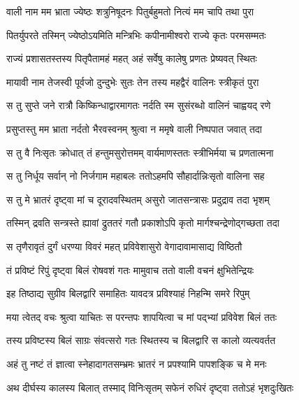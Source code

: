 
\twolineshloka
{वाली नाम मम भ्राता ज्येष्ठः शत्रुनिषूदनः}
{पितुर्बहुमतो नित्यं मम चापि तथा पुरा} %

\twolineshloka
{पितर्युपरते तस्मिन् ज्येष्ठोऽयमिति मन्त्रिभिः}
{कपीनामीश्वरो राज्ये कृतः परमसम्मतः} %

\twolineshloka
{राज्यं प्रशासतस्तस्य पितृपैतामहं महत्}
{अहं सर्वेषु कालेषु प्रणतः प्रेष्यवत् स्थितः} %

\twolineshloka
{मायावी नाम तेजस्वी पूर्वजो दुन्दुभेः सुतः}
{तेन तस्य महद्वैरं वालिनः स्त्रीकृतं पुरा} %

\twolineshloka
{स तु सुप्ते जने रात्रौ किष्किन्धाद्वारमागतः}
{नर्दति स्म सुसंरब्धो वालिनं चाह्वयद् रणे} %

\twolineshloka
{प्रसुप्तस्तु मम भ्राता नर्दतो भैरवस्वनम्}
{श्रुत्वा न ममृषे वाली निष्पपात जवात् तदा} %

\twolineshloka
{स तु वै निःसृतः क्रोधात् तं हन्तुमसुरोत्तमम्}
{वार्यमाणस्ततः स्त्रीभिर्मया च प्रणतात्मना} %

\twolineshloka
{स तु निर्धूय सर्वान् नो निर्जगाम महाबलः}
{ततोऽहमपि सौहार्दान्निःसृतो वालिना सह} %

\twolineshloka
{स तु मे भ्रातरं दृष्ट्वा मां च दूरादवस्थितम्}
{असुरो जातसन्त्रासः प्रदुद्राव तदा भृशम्} %

\twolineshloka
{तस्मिन् द्रवति सन्त्रस्ते ह्यावां द्रुततरं गतौ}
{प्रकाशोऽपि कृतो मार्गश्चन्द्रेणोद्गच्छता तदा} %

\twolineshloka
{स तृणैरावृतं दुर्गं धरण्या विवरं महत्}
{प्रविवेशासुरो वेगादावामासाद्य विष्ठितौ} %

\twolineshloka
{तं प्रविष्टं रिपुं दृष्ट्वा बिलं रोषवशं गतः}
{मामुवाच ततो वाली वचनं क्षुभितेन्द्रियः} %

\twolineshloka
{इह तिष्ठाद्य सुग्रीव बिलद्वारि समाहितः}
{यावदत्र प्रविश्याहं निहन्मि समरे रिपुम्} %

\twolineshloka
{मया त्वेतद् वचः श्रुत्वा याचितः स परन्तपः}
{शापयित्वा च मां पद्भ्यां प्रविवेश बिलं ततः} %

\twolineshloka
{तस्य प्रविष्टस्य बिलं साग्रः संवत्सरो गतः}
{स्थितस्य च बिलद्वारि स कालो व्यत्यवर्तत} %

\twolineshloka
{अहं तु नष्टं तं ज्ञात्वा स्नेहादागतसम्भ्रमः}
{भ्रातरं न प्रपश्यामि पापशङ्कि च मे मनः} %

\twolineshloka
{अथ दीर्घस्य कालस्य बिलात् तस्माद् विनिःसृतम्}
{सफेनं रुधिरं दृष्ट्वा ततोऽहं भृशदुःखितः} %

